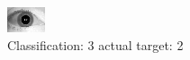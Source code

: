 \begin{figure}[h!]
\begin{center}
\includegraphics[width=0.60\columnwidth]{figures/ID1706_class_3_target_2.png}
\end{center}
\caption{ Classification: 3 actual target: 2}
\label{fig:ID1706_class_3_target_2}
\end{figure}
